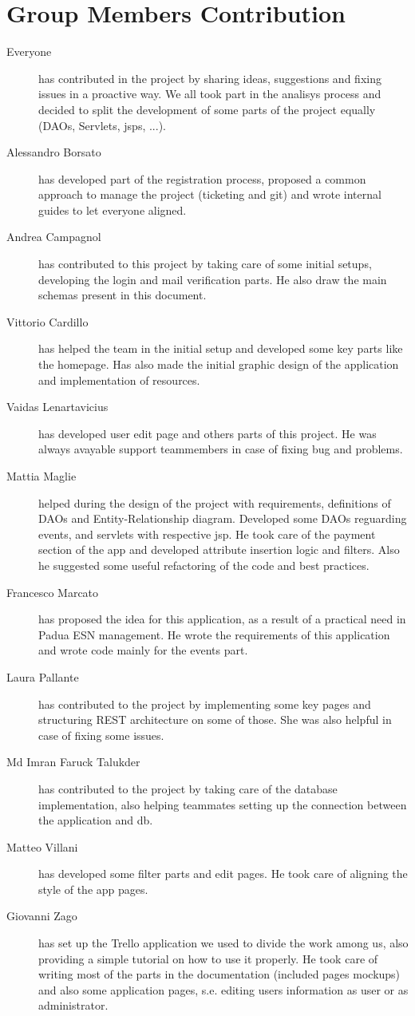 \section{Group Members Contribution}

\begin{description}
    \item[Everyone] has contributed in the project by sharing ideas, suggestions and fixing issues in a proactive way. We all took part in the analisys process and decided to split the development of some parts of the project equally (DAOs, Servlets, jsps, ...).
    \item[Alessandro Borsato] has developed part of the registration process, proposed a common approach to manage the project (ticketing and git) and wrote internal guides to let everyone aligned.
    \item[Andrea Campagnol] has contributed to this project by taking care of some initial setups, developing the login and mail verification parts. He also draw the main schemas present in this document.
    \item[Vittorio Cardillo] has helped the team in the initial setup and developed some key parts like the homepage. Has also made the initial graphic design of the application and implementation of resources.
    \item[Vaidas Lenartavicius] has developed user edit page and others parts of this project. He was always avayable support teammembers in case of fixing bug and problems.
    \item[Mattia Maglie] helped during the design of the project with requirements, definitions of DAOs and Entity-Relationship diagram. Developed some DAOs reguarding events, and servlets with respective jsp. He took care of the payment section of the app and developed attribute insertion logic and filters. Also he suggested some useful refactoring of the code and best practices.
    \item[Francesco Marcato] has proposed the idea for this application, as a result of a practical need in Padua ESN management. He wrote the requirements of this application and wrote code mainly for the events part.
    \item[Laura Pallante] has contributed to the project by implementing some key pages and structuring REST architecture on some of those. She was also helpful in case of fixing some issues.
    \item[Md Imran Faruck Talukder] has contributed to the project by taking care of the database implementation, also helping teammates setting up the connection between the application and db.
    \item[Matteo Villani] has developed some filter parts and edit pages. He took care of aligning the style of the app pages.
    \item[Giovanni Zago] has set up the Trello application we used to divide the work among us, also providing a simple tutorial on how to use it properly. He took care of writing most of the parts in the documentation (included pages mockups) and also some application pages, s.e. editing users information as user or as administrator.
\end{description}
